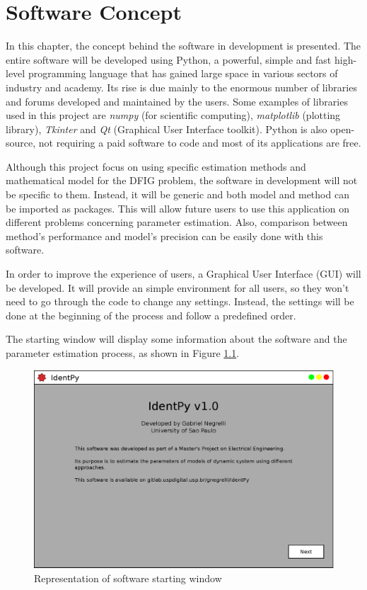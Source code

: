 \chapter{Software Concept}

\label{ch: software}

In this chapter, the concept behind the software in development is presented. The entire software will be developed using Python, a powerful, simple and fast high-level programming language that has gained large space in various sectors of industry and academy. Its rise is due mainly to the enormous number of libraries and forums developed and maintained by the users. Some examples of libraries used in this project are \textit{numpy} (for scientific computing), \textit{matplotlib} (plotting library), \textit{Tkinter} and \textit{Qt} (Graphical User Interface toolkit). Python is also open-source, not requiring a paid software to code and most of its applications are free.

Although this project focus on using specific estimation methods and mathematical model for the DFIG problem, the software in development will not be specific to them. Instead, it will be generic and both model and method can be imported as packages. This will allow future users to use this application on different problems concerning parameter estimation. Also, comparison between method's performance and model's precision can be easily done with this software.

In order to improve the experience of users, a Graphical User Interface (GUI) will be developed. It will provide an simple environment for all users, so they won't need to go through the code to change any settings. Instead, the settings will be done at the beginning of the process and follow a predefined order.

The starting window will display some information about the software and the parameter estimation process, as shown in Figure \ref{fig: init_pg}.

\begin{figure}[h]
	\caption{Representation of software starting window}
	\begin{center}
		\includegraphics[scale=.5]{Images/Software_init_pg.eps}
	\end{center}
	\label{fig: init_pg}
\end{figure}

